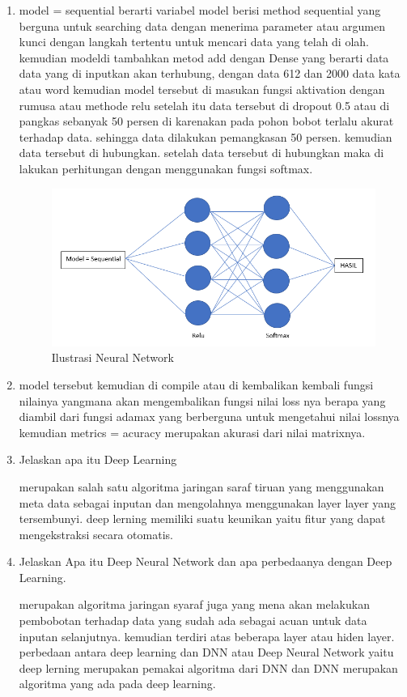 \begin{enumerate}
\item model = sequential berarti variabel model berisi method sequential yang berguna untuk searching data dengan menerima parameter atau argumen kunci dengan langkah tertentu untuk mencari data yang telah di olah. kemudian modeldi tambahkan metod add dengan Dense yang berarti data data yang di inputkan akan terhubung, dengan data 612 dan 2000 data  kata atau word kemudian model tersebut di masukan fungsi aktivation dengan rumusa atau methode relu setelah itu data tersebut di dropout 0.5 atau di pangkas sebanyak 50 persen di karenakan pada pohon bobot terlalu akurat terhadap data. sehingga data dilakukan pemangkasan 50 persen. kemudian data tersebut di hubungkan. setelah data tersebut di hubungkan maka di lakukan perhitungan dengan menggunakan fungsi softmax. 
\begin{figure}[ht]
\centering
\includegraphics[scale=0.4]{figures/1174042/chapter7/1,9.PNG}
\caption{Ilustrasi Neural Network}
\label{Contoh}
\end{figure}


\item model tersebut kemudian di compile atau di kembalikan kembali fungsi nilainya yangmana akan mengembalikan fungsi nilai loss nya berapa yang diambil dari fungsi adamax yang berberguna untuk  mengetahui nilai lossnya kemudian metrics = acuracy merupakan akurasi dari nilai matrixnya.

\item Jelaskan apa itu Deep Learning \par
merupakan salah satu algoritma jaringan saraf tiruan yang menggunakan meta data sebagai inputan dan mengolahnya menggunakan layer layer yang tersembunyi. deep lerning memiliki suatu keunikan yaitu fitur yang dapat mengekstraksi secara otomatis.

\item Jelaskan Apa itu Deep Neural Network dan apa perbedaanya dengan Deep Learning.\par
merupakan algoritma jaringan syaraf juga yang mena akan melakukan pembobotan terhadap data yang sudah ada sebagai acuan untuk data inputan selanjutnya. kemudian terdiri atas beberapa layer atau hiden layer. perbedaan antara deep learning dan DNN atau Deep Neural Network yaitu deep lerning merupakan pemakai algoritma dari DNN dan DNN merupakan algoritma yang ada pada deep learning.


\end{enumerate}
